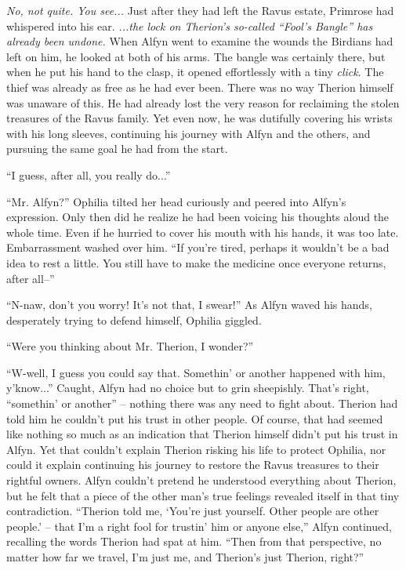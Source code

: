 \emph{No, not quite. You see...} Just after they had left the Ravus estate, Primrose had whispered into his ear. \emph{...the lock on Therion's so-called ``Fool's Bangle'' has already been undone.} When Alfyn went to examine the wounds the Birdians had left on him, he looked at both of his arms. The bangle was certainly there, but when he put his hand to the clasp, it opened effortlessly with a tiny \emph{click}. The thief was already as free as he had ever been. There was no way Therion himself was unaware of this. He had already lost the very reason for reclaiming the stolen treasures of the Ravus family. Yet even now, he was dutifully covering his wrists with his long sleeves, continuing his journey with Alfyn and the others, and pursuing the same goal he had from the start.

``I guess, after all, you really do...''

``Mr. Alfyn?'' Ophilia tilted her head curiously and peered into Alfyn's expression. Only then did he realize he had been voicing his thoughts aloud the whole time. Even if he hurried to cover his mouth with his hands, it was too late. Embarrassment washed over him. ``If you're tired, perhaps it wouldn't be a bad idea to rest a little. You still have to make the medicine once everyone returns, after all--''

``N-naw, don't you worry! It's not that, I swear!'' As Alfyn waved his hands, desperately trying to defend himself, Ophilia giggled. 

``Were you thinking about Mr. Therion, I wonder?''

``W-well, I guess you could say that. Somethin' or another happened with him, y'know...'' Caught, Alfyn had no choice but to grin sheepishly. That's right, ``somethin' or another'' -- nothing there was any need to fight about. Therion had told him he couldn't put his trust in other people. Of course, that had seemed like nothing so much as an indication that Therion himself didn't put his trust in Alfyn. Yet that couldn't explain Therion risking his life to protect Ophilia, nor could it explain continuing his journey to restore the Ravus treasures to their rightful owners. Alfyn couldn't pretend he understood everything about Therion, but he felt that a piece of the other man's true feelings revealed itself in that tiny contradiction. ``Therion told me, `You're just yourself. Other people are other people.' -- that I'm a right fool for trustin' him or anyone else,'' Alfyn continued, recalling the words Therion had spat at him. ``Then from that perspective, no matter how far we travel, I'm just me, and Therion's just Therion, right?''


